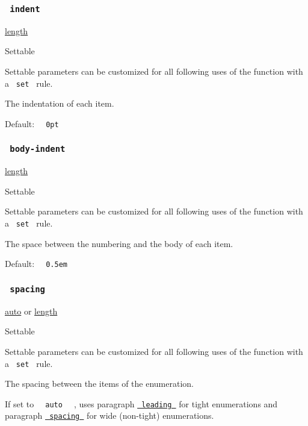 \subsubsection{\texorpdfstring{\texttt{\ indent\ }}{ indent }}\label{parameters-indent}

\href{/docs/reference/layout/length/}{length}

{{ Settable }}

\label{parameters-indent-settable-tooltip}
Settable parameters can be customized for all following uses of the
function with a \texttt{\ set\ } rule.

The indentation of each item.

Default: \texttt{\ }{\texttt{\ 0pt\ }}\texttt{\ }

\subsubsection{\texorpdfstring{\texttt{\ body-indent\ }}{ body-indent }}\label{parameters-body-indent}

\href{/docs/reference/layout/length/}{length}

{{ Settable }}

\label{parameters-body-indent-settable-tooltip}
Settable parameters can be customized for all following uses of the
function with a \texttt{\ set\ } rule.

The space between the numbering and the body of each item.

Default: \texttt{\ }{\texttt{\ 0.5em\ }}\texttt{\ }

\subsubsection{\texorpdfstring{\texttt{\ spacing\ }}{ spacing }}\label{parameters-spacing}

\href{/docs/reference/foundations/auto/}{auto} {or}
\href{/docs/reference/layout/length/}{length}

{{ Settable }}

\label{parameters-spacing-settable-tooltip}
Settable parameters can be customized for all following uses of the
function with a \texttt{\ set\ } rule.

The spacing between the items of the enumeration.

If set to \texttt{\ }{\texttt{\ auto\ }}\texttt{\ } , uses paragraph
\href{/docs/reference/model/par/\#parameters-leading}{\texttt{\ leading\ }}
for tight enumerations and paragraph
\href{/docs/reference/model/par/\#parameters-spacing}{\texttt{\ spacing\ }}
for wide (non-tight) enumerations.

